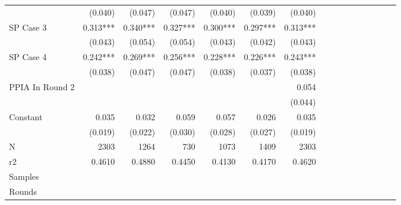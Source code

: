 \begin{tabular}{@{\extracolsep{5pt}}lrrrrrrrrrrrrrrr}
& (0.040)\phantom{***} & (0.047)\phantom{***} & (0.047)\phantom{***} & (0.040)\phantom{***} & (0.039)\phantom{***} & (0.040)\phantom{***} \\
SP Case 3 & 0.313\phantom{)}*** & 0.340\phantom{)}*** & 0.327\phantom{)}*** & 0.300\phantom{)}*** & 0.297\phantom{)}*** & 0.313\phantom{)}*** \\
& (0.043)\phantom{***} & (0.054)\phantom{***} & (0.054)\phantom{***} & (0.043)\phantom{***} & (0.042)\phantom{***} & (0.043)\phantom{***} \\
SP Case 4 & 0.242\phantom{)}*** & 0.269\phantom{)}*** & 0.256\phantom{)}*** & 0.228\phantom{)}*** & 0.226\phantom{)}*** & 0.243\phantom{)}*** \\
& (0.038)\phantom{***} & (0.047)\phantom{***} & (0.047)\phantom{***} & (0.038)\phantom{***} & (0.037)\phantom{***} & (0.038)\phantom{***} \\
PPIA In Round 2 & \phantom{***} & \phantom{***} & \phantom{***} & \phantom{***} & \phantom{***} & 0.054\phantom{\phantom{)}***} \\
& \phantom{***} & \phantom{***} & \phantom{***} & \phantom{***} & \phantom{***} & (0.044)\phantom{***} \\
Constant & 0.035\phantom{\phantom{)}***} & 0.032\phantom{\phantom{)}***} & 0.059\phantom{\phantom{)}***} & 0.057\phantom{\phantom{)}***} & 0.026\phantom{\phantom{)}***} & 0.035\phantom{\phantom{)}***} \\
& (0.019)\phantom{***} & (0.022)\phantom{***} & (0.030)\phantom{***} & (0.028)\phantom{***} & (0.027)\phantom{***} & (0.019)\phantom{***} \\
\hline
N & 2303\phantom{***} & 1264\phantom{***} & 730\phantom{***} & 1073\phantom{***} & 1409\phantom{***} & 2303\phantom{***} \\
r2 & 0.4610\phantom{***} & 0.4880\phantom{***} & 0.4450\phantom{***} & 0.4130\phantom{***} & 0.4170\phantom{***} & 0.4620\phantom{***} \\
{Samples}} & \multicolumn{1}{p{0.13\linewidth}}{\centering{All}} & \multicolumn{1}{p{0.13\linewidth}}{\centering{1a 2a 3}} & \multicolumn{1}{p{0.13\linewidth}}{\centering{1a}} & \multicolumn{1}{p{0.13\linewidth}}{\centering{1a}} & \multicolumn{1}{p{0.13\linewidth}}{\centering{All ex. 4}} & \multicolumn{1}{p{0.13\linewidth}}{\centering{All}} \\
{Rounds}} & \multicolumn{1}{p{0.13\linewidth}}{\centering{All}} & \multicolumn{1}{p{0.13\linewidth}}{\centering{1 2}} & \multicolumn{1}{p{0.13\linewidth}}{\centering{1 2}} & \multicolumn{1}{p{0.13\linewidth}}{\centering{All}} & \multicolumn{1}{p{0.13\linewidth}}{\centering{All}} & \multicolumn{1}{p{0.13\linewidth}}{\centering{All}} \\

\end{tabular}
